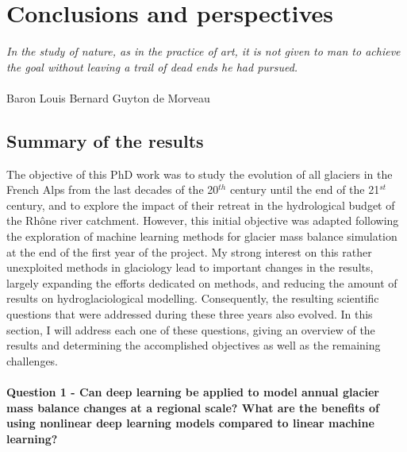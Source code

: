 \chapter{Conclusions and perspectives}
\label{chap:discussion}

\begin{flushright}
\begin{small}
\textit{In the study of nature, as in the practice of art, it is not given to man to achieve the goal without leaving a trail of dead ends he had pursued.}\\ \\
Baron Louis Bernard Guyton de Morveau
\end{small}
\end{flushright}

\section{Summary of the results}

The objective of this PhD work was to study the evolution of all glaciers in the French Alps from the last decades of the 20$^{th}$ century until the end of the 21$^{st}$ century, and to explore the impact of their retreat in the hydrological budget of the Rhône river catchment. However, this initial objective was adapted following the exploration of machine learning methods for glacier mass balance simulation at the end of the first year of the project. My strong interest on this rather unexploited methods in glaciology lead to important changes in the results, largely expanding the efforts dedicated on methods, and reducing the amount of results on hydroglaciological modelling. Consequently, the resulting scientific questions that were addressed during these three years also evolved. In this section, I will address each one of these questions, giving an overview of the results and determining the accomplished objectives as well as the remaining challenges.

\subsubsection{Question 1 - Can deep learning be applied to model annual glacier mass balance changes at a regional scale? What are the benefits of using nonlinear deep learning models compared to linear machine learning?}

